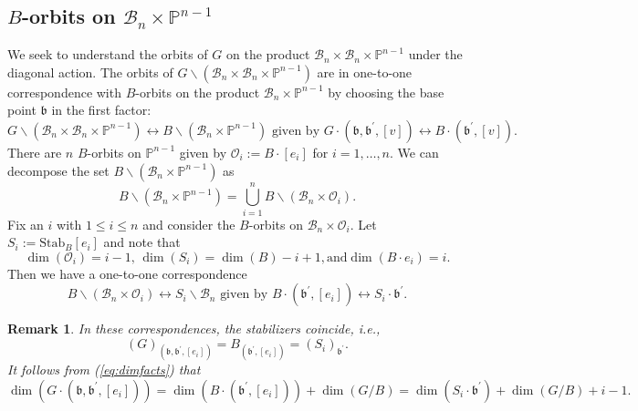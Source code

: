 \documentclass[12pt]{amsart}
\numberwithin{equation}{section}
\newtheorem{rem}[thm]{Remark}
\newcommand{\fb}{\mbox{${\mathfrak b}$}}
\newcommand{\B}{\mathcal{B}}
\begin{document}
\subsection{$B$-orbits on $\B_n \times \mathbb{P}^{n-1}$}

 We seek to understand the orbits of $G$ on 
the product $\B_{n}\times\B_{n}\times\mathbb{P}^{n-1}$ under the diagonal action.  %
 The orbits of  $G\backslash (\B_{n}\times\B_{n}\times\mathbb{P}^{n-1})$ are in one-to-one correspondence with 
$B$-orbits on the product $\B_{n}\times \mathbb{P}^{n-1}$ by choosing the base point $\fb$  in the first factor: %
\begin{equation}\label{eq:Gdeltacorres}
G\backslash(\B_{n}\times\B_{n}\times\mathbb{P}^{n-1})\longleftrightarrow B\backslash (\B_{n}\times \mathbb{P}^{n-1}) \mbox{ given by } G\cdot (\fb,\fb^{\prime},[v])\leftrightarrow B\cdot (\fb^{\prime}, [v]).
\end{equation}  
 There are $n$ $B$-orbits on $\mathbb{P}^{n-1}$  given by $\mathcal{O}_{i}:=B\cdot[e_{i}]$ for $i=1,\dots, n.$
  We can decompose the set $B\backslash (\B_{n}\times\mathbb{P}^{n-1})$ as
\begin{equation}\label{eq:orbitspacedecomp}
B\backslash (\B_{n}\times\mathbb{P}^{n-1})=\bigcup_{i=1}^{n} B\backslash (\B_{n}\times\mathcal{O}_{i}).
\end{equation}
Fix an $i$ with $1\leq i \leq n$ and consider the $B$-orbits on $\B_{n}\times\mathcal{O}_{i}$.  Let
$S_{i}:=\mbox{Stab}_{B}[e_{i}]$ and note that 
\begin{equation}\label{eq:dimfacts}
\dim(\mathcal{O}_{i})=i-1,\, \dim(S_i)=\dim(B)-i+1, \text{and} \dim(B\cdot e_i)=i.
\end{equation}
  Then we have a one-to-one correspondence 
\begin{equation}\label{eq:Sicorres}
B\backslash (\B_{n}\times\mathcal{O}_{i})\longleftrightarrow S_{i}\backslash \B_{n} \mbox{ given by } B\cdot(\fb^{\prime},[e_{i}])\longleftrightarrow S_{i}\cdot\fb^{\prime}.
\end{equation}
\begin{rem}\label{r:dimcorr}
In these correspondences, the stabilizers coincide, i.e.,
\begin{equation}
(G)_{(\fb, \fb^{\prime}, [e_i])}=B_{(\fb^{\prime},[e_i])}=(S_i)_{\fb^{\prime}}.
\end{equation} 
It follows from (\ref{eq:dimfacts}) that
\begin{equation}\label{e:dimcorr}
\dim(G\cdot (\fb, \fb^{\prime}, [e_i]))=\dim(B\cdot (\fb^{\prime},[e_i])) + \dim(G/B) = \dim(S_i \cdot \fb^{\prime}) + \dim(G/B) + i-1.
\end{equation}
\end{rem}
\end{document}
